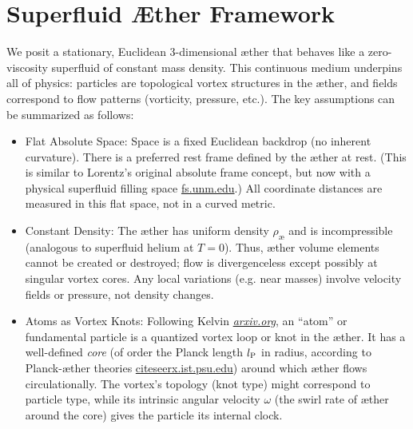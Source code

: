 \documentclass[aps,preprint,superscriptaddress]{revtex4}
\begin{document}
    \section*{Superfluid Æther Framework}

    We posit a stationary, Euclidean 3-dimensional æther that behaves like a zero-viscosity superfluid of constant mass density. This continuous medium underpins all of physics: particles are topological vortex structures in the æther, and fields correspond to flow patterns (vorticity, pressure, etc.). The key assumptions can be summarized as follows:

    \begin{itemize}
        \item
        Flat Absolute Space: Space is a fixed Euclidean backdrop (no inherent curvature). There is a preferred rest frame defined by the æther at rest. (This is similar to Lorentz’s original absolute frame concept, but now with a physical superfluid filling space
        \href{https://fs.unm.edu/QuantizationDiscretization.pdf#:~:text=Winterberg%20,an%20equal%20number%20of%20positive}{fs.unm.edu}.) All coordinate distances are measured in this flat space, not in a curved metric.

        \item
        Constant Density: The æther has uniform density $\rho_{\text{\ae}}$ and is incompressible (analogous to superfluid helium at $T=0$). Thus, æther volume elements cannot be created or destroyed; flow is divergenceless except possibly at singular vortex cores. Any local variations (e.g. near masses) involve velocity fields or pressure, not density changes.

        \item
        Atoms as Vortex Knots: Following Kelvin
        \href{https://arxiv.org/pdf/2012.07395#:~:text=Thomson%20,on%20the%20right%20path%20when}{\textit{arxiv.org}}, an “atom” or fundamental particle is a quantized vortex loop or knot in the æther. It has a well-defined \textit{core} (of order the Planck length $l_{\textrm P}$ in radius, according to Planck-æther theories
        \href{https://citeseerx.ist.psu.edu/document?repid=rep1&type=pdf&doi=25483f1ebc9dc442a9f1505a49d96eb35e92e3f4#:~:text=45,on%20General%20Relativity%20and%20Relativistic}{citeseerx.ist.psu.edu}) around which æther flows circulationally. The vortex’s topology (knot type) might correspond to particle type, while its intrinsic angular velocity $\omega$ (the swirl rate of æther around the core) gives the particle its internal clock.


\end{itemize}
\end{document}
